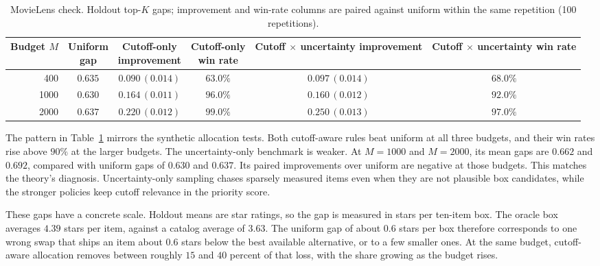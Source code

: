 \documentclass[11pt]{article}
\theoremstyle{definition}
\theoremstyle{remark}
\newcommand{\1}{\mathbf{1}}
\begin{document}
\begin{table}[h!]
\centering
\scriptsize
\setlength{\tabcolsep}{3pt}
\begin{tabular}{rccccc}
\toprule
Budget $M$ & \shortstack{Uniform\\gap} & \shortstack{Cutoff-only\\improvement} & \shortstack{Cutoff-only\\win rate} & \shortstack{Cutoff $\times$ uncertainty\\improvement} & \shortstack{Cutoff $\times$ uncertainty\\win rate} \\
\midrule
400  & $0.635$ & $0.090\,(0.014)$ & $63.0\%$ & $0.097\,(0.014)$ & $68.0\%$ \\
1000 & $0.630$ & $0.164\,(0.011)$ & $96.0\%$ & $0.160\,(0.012)$ & $92.0\%$ \\
2000 & $0.637$ & $0.220\,(0.012)$ & $99.0\%$ & $0.250\,(0.013)$ & $97.0\%$ \\
\bottomrule
\end{tabular}
\caption{MovieLens check. Holdout top-\(K\) gaps; improvement and win-rate columns are paired against uniform within the same repetition (100 repetitions).}
\label{tab:movielens_results}
\end{table}

The pattern in Table~\ref{tab:movielens_results} mirrors the synthetic
allocation tests. Both cutoff-aware rules beat uniform at all three
budgets, and their win rates rise above \(90\%\) at the larger budgets.
The uncertainty-only benchmark is weaker. At \(M=1000\) and \(M=2000\), its mean gaps are \(0.662\) and \(0.692\),
compared with uniform gaps of \(0.630\) and \(0.637\). Its paired improvements over uniform are
negative at those budgets. This matches the theory's diagnosis. Uncertainty-only sampling chases sparsely measured items
even when they are not plausible box candidates, while the stronger
policies keep cutoff relevance in the priority score.

These gaps have a concrete scale. Holdout means are star ratings, so
the gap is measured in stars per ten-item box. The oracle box averages
\(4.39\) stars per item, against a catalog average of \(3.63\). The
uniform gap of about \(0.6\) stars per box therefore corresponds to one
wrong swap that ships an item about \(0.6\) stars below the best
available alternative, or to a few smaller ones. At the same budget,
cutoff-aware allocation removes between roughly \(15\) and \(40\)
percent of that loss, with the share growing as the budget rises.
\end{document}
